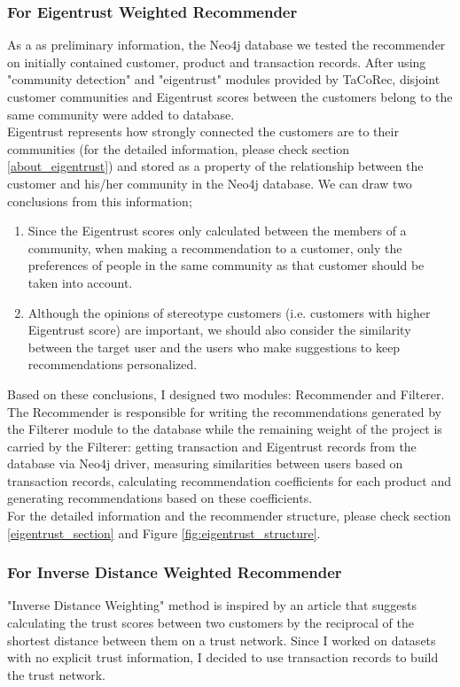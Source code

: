 \subsubsection{For Eigentrust Weighted Recommender}
As a as preliminary information, the Neo4j database we tested the recommender on initially contained customer, product and transaction records. After using "community detection" and "eigentrust" modules provided by TaCoRec, disjoint customer communities and Eigentrust scores between the customers belong to the same community were added to database.\\

Eigentrust represents how strongly connected the customers are to their communities (for the detailed information, please check section \ref{about_eigentrust}) and stored as a property of the relationship between the customer and his/her community in the Neo4j database. We can draw two conclusions from this information;
\begin{enumerate}
	\item Since the Eigentrust scores only calculated between the members of a community, when making a recommendation to a customer, only the preferences of people in the same community as that customer should be taken into account.
	\item Although the opinions of stereotype customers (i.e. customers with higher Eigentrust score) are important, we should also consider the similarity between the target user and the users who make suggestions to keep recommendations personalized.
\end{enumerate}
Based on these conclusions, I designed two modules: Recommender and Filterer. The Recommender is responsible for writing the recommendations generated by the Filterer module to the database while the remaining weight of the project is carried by the Filterer: getting transaction and Eigentrust records from the database via Neo4j driver, measuring similarities between users based on transaction records, calculating recommendation coefficients for each product and generating recommendations based on these coefficients. \\

For the detailed information and the recommender structure, please check section \ref{eigentrust_section} and Figure \ref{fig:eigentrust_structure}.
\subsubsection{For Inverse Distance Weighted Recommender}
"Inverse Distance Weighting" method is inspired by an article\cite{inverse_article} that suggests calculating the trust scores between two customers by the reciprocal of the shortest distance between them on a trust network. Since I worked on datasets with no explicit trust information, I decided to use transaction records to build the trust network. \\

